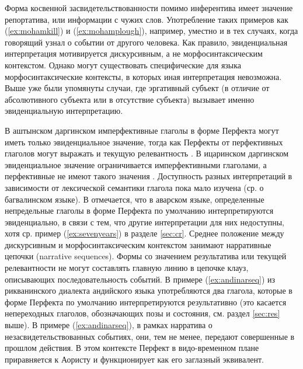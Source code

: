 Форма косвенной засвидетельствованности помимо инферентива имеет значение репортатива, или информации с чужих слов. Употребление таких примеров как (\ref{ex:mohamkill}) и (\ref{ex:mohamplough}), например, уместно и в тех случаях, когда говорящий узнал о событии от другого человека. Как правило, эвиденциальная интерпретация мотивируется дискурсивным, а не морфосинтаксическим контекстом. Однако могут существовать специфические для языка морфосинтаксические контексты, в которых иная интерпретация невозможна. Выше уже были упомянуты случаи, где эргативный субъект (в отличие от абсолютивного субъекта или в отсутствие субъекта) вызывает именно эвиденциальную интерпретацию. 
\par В аштынском даргинском имперфективные глаголы в форме Перфекта могут иметь только эвиденциальное значение, тогда как Перфекты от перфективных глаголов могут выражать и текущую релевантность \citep{belyaev2012}. В ицаринском даргинском эвиденциальное значение ограничивается имперфективными глаголами, а перфективные не имеют такого значения \citep{sumbatovamutalov2003}. Доступность разных интерпретаций в зависимости от лексической семантики глагола пока мало изучена (ср. \citep{tatevosov2007} о багвалинском языке). В \citep[193--194]{forker2018evidavar} отмечается, что в аварском языке, определенные непредельные глаголы в форме Перфекта по умолчанию интерпретируются эвиденциально, в связи с тем, что другие интерпретации для них недоступны, хотя ср. пример (\ref{ex:sevenyears}) в разделе \ref{sec:cr}. Среднее положение между дискурсивным и морфосинтаксическим контекстом занимают нарративные цепочки (narrative sequences). Формы со значением результатива или текущей релевантности не могут составлять главную линию в цепочке клауз, описывающих последовательность событий. В примере (\ref{ex:andinarseq}) из рикванинского диалекта андийского языка употребляются два глагола, которые в форме Перфекта по умолчанию интерпретируются результативно (это касается непереходных глаголов, обозначающих позы и состояния, см. раздел \ref{sec:res} выше). В примере (\ref{ex:andinarseq}), в рамках нарратива о незасвидетельствованных событиях, они, тем не менее, передают совершенные в прошлом действия. В этом контексте Перфект в видо-временном плане приравняется к Аористу и функционирует как его заглазный эквивалент.


